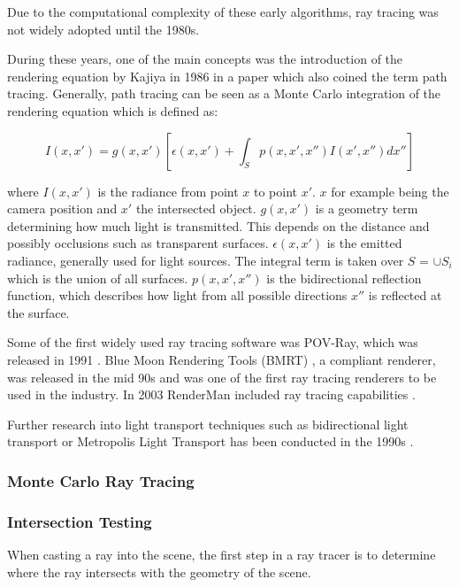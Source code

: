 Due to the computational complexity of these early algorithms, ray tracing was not widely adopted until the 1980s.

During these years, one of the main concepts was the introduction of the rendering equation by Kajiya in 1986 in a paper which also coined the term path tracing. Generally, path tracing can be seen as a Monte Carlo integration of the rendering equation which is defined as:

\begin{equation}
  \label{eqn:rendering-equation}
  I(x, x') = g(x, x') [\epsilon(x, x') + \int_{S} p(x, x', x'')I(x', x'')dx'']
\end{equation}

where $I(x, x')$ is the radiance from point $x$ to point $x'$. $x$ for example being the camera position and $x'$ the intersected object. $g(x, x')$ is a geometry term determining how much light is transmitted. This depends on the distance and possibly occlusions such as transparent surfaces. $\epsilon(x, x')$ is the emitted radiance, generally used for light sources. The integral term is taken over $S$ = $\cup S_i$ which is the union of all surfaces. $p(x, x', x'')$ is the bidirectional reflection function, which describes how light from all possible directions $x''$ is reflected at the surface. \cite{kajiya1986rendering}

Some of the first widely used ray tracing software was POV-Ray, which was released in 1991 \cite{POV_Ray_Documentation}. Blue Moon Rendering Tools (\gls{BMRT}) \cite{bmrt}, a  compliant renderer, was released in the mid 90s and was one of the first ray tracing renderers to be used in the industry. In 2003 \gls{RenderMan} included ray tracing capabilities \cite{RenderMan_11_Release_Notes}.

Further research into light transport techniques such as bidirectional light transport or Metropolis Light Transport has been conducted in the 1990s \cite{veachMonteCarloLightTransport}.

\subsubsection{Monte Carlo Ray Tracing}
\subsubsection{Intersection Testing}

When casting a ray into the scene, the first step in a ray tracer is to determine where the ray intersects with the geometry of the scene.

